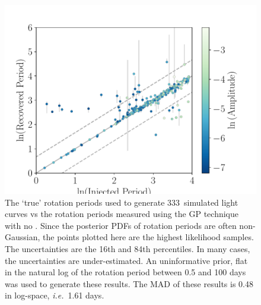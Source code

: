 \documentclass[useAMS, usenatbib, preprint, 12pt]{aastex}
\newcommand{\ie}{{\it i.e.}}
\newcommand{\naigrain}{333}
\begin{document}
\begin{figure}
\begin{center}
\includegraphics[width=6in, clip=true]{figures/comparison_noprior_02_13.pdf}
\caption{The `true' rotation periods used to generate \naigrain\
simulated light curves vs the rotation periods measured using the GP
technique with no .
Since the posterior PDFs of rotation periods are often non-Gaussian,
the points plotted here are the highest likelihood samples.
The uncertainties are the 16th and 84th percentiles.
In many cases, the uncertainties are under-estimated.
An uninformative prior, flat in the natural log of the rotation period between
    0.5 and 100 days was used to generate these results.
The MAD of these results is 0.48 in log-space, \ie\ 1.61 days.
    }
\label{fig:compare_mcmc_noprior}
\end{center}
\end{figure}
\end{document}
